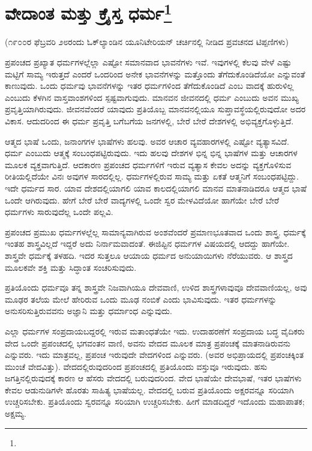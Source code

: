
\chapter{ವೇದಾಂತ ಮತ್ತು ಕ್ರೈಸ್ತ ಧರ್ಮ\protect\footnote{}}

\begin{center}
(೧೯೦೦ರ ಫೆಬ್ರವರಿ ೨೮ರಂದು ಓಕ್‌ಲ್ಯಾಂಡಿನ ಯೂನಿಟೇರಿಯನ್ ಚರ್ಚಿನಲ್ಲಿ ನೀಡಿದ ಪ್ರವಚನದ ಟಿಪ್ಪಣಿಗಳು)
\end{center}

ಪ್ರಪಂಚದ ಪ್ರಖ್ಯಾತ ಧರ್ಮಗಳಲ್ಲೆಲ್ಲಾ ಎಷ್ಟೋ ಸಮಾನವಾದ ಭಾವನೆಗಳು ಇವೆ. ಇವುಗಳಲ್ಲಿ ಕೆಲವು ವೇಳೆ ಎಷ್ಟು ಮಟ್ಟಿಗೆ ಸಾಮ್ಯ ಇರುತ್ತದೆ ಎಂದರೆ ಒಂದರಿಂದ ಅನೇಕ ಭಾವನೆಗಳನ್ನು ಮತ್ತೊಂದು ತೆಗೆದುಕೊಂಡಿದೆಯೋ ಎನ್ನುವಂತೆ ಕಾಣುವುದು. ಒಂದು ಧರ್ಮವು ಭಾವನೆಗಳನ್ನು ಇತರ ಧರ್ಮಗಳಿಂದ ತೆಗೆದುಕೊಂಡಿದೆ ಎಂಬ ವಾದಕ್ಕೆ ಹುರುಳಿಲ್ಲ ಎಂಬುದು ಕೆಳಗಿನ ವಾಸ್ತವಾಂಶಗಳಿಂದ ಸ್ಪಷ್ಟವಾಗುವುದು. ಮಾನವನ ಜೀವನದಲ್ಲಿ ಧರ್ಮ ಎಂಬುದು ಅವನ ಮುಖ್ಯ ಪ್ರವೃತ್ತಿಯಾಗಿರುವುದು. ಜೀವನವೆಂದರೆ ಯಾವುದು ಪ್ರತಿಯೊಬ್ಬ ಮಾನವನಲ್ಲಿಯೂ ಸುಪ್ತಾವಸ್ಥೆಯಲ್ಲಿರುವುದೋ ಅದರ ವಿಕಾಸ. ಆದುದರಿಂದ ಈ ಧರ್ಮ ಪ್ರವೃತ್ತಿ ಬಗೆಬಗೆಯ ಜನಗಳಲ್ಲಿ, ಬೇರೆ ಬೇರೆ ದೇಶಗಳಲ್ಲಿ ಅಭಿವ್ಯಕ್ತಗೊಳ್ಳುತ್ತಿದೆ.

ಆತ್ಮದ ಭಾಷೆ ಒಂದು, ಜನಾಂಗಗಳ ಭಾಷೆಗಳು ಹಲವು. ಅವರ ಆಚಾರ ವ್ಯವಹಾರಗಳಲ್ಲಿ ಎಷ್ಟೋ ವ್ಯತ್ಯಾಸವಿದೆ. ಧರ್ಮ ಎಂಬುದು ಆತ್ಮಕ್ಕೆ ಸಂಬಂಧಪಟ್ಟಿರುವುದು. ಇದು ಹಲವು ದೇಶಗಳ ಭಿನ್ನ ಭಿನ್ನ ಭಾಷೆಗಳ ಮತ್ತು ಆಚಾರಗಳ ಮೂಲಕ ವ್ಯಕ್ತವಾಗುತ್ತಿದೆ. ಆದಕಾರಣ ಪ್ರಪಂಚದ ಧರ್ಮಗಳಿಗೆ ಇರುವ ವ್ಯತ್ಯಾಸ ಕೇವಲ ಅದನ್ನು ವ್ಯಕ್ತಗೊಳಿಸುವ ರೀತಿಯಲ್ಲಿದೆಯೇ ವಿನಃ ಅವುಗಳ ಸಾರದಲ್ಲಿಲ್ಲ. ಧರ್ಮಗಳಲ್ಲಿರುವ ಸಾಮ್ಯ ಮತ್ತು ಏಕತೆ ಆತ್ಮನಿಗೆ ಸಂಬಂಧಪಟ್ಟಿದ್ದು. ಇದೇ ಧರ್ಮದ ಸಾರ. ಯಾವ ದೇಶದಲ್ಲಿಯಾಗಲಿ ಯಾವ ಕಾಲದಲ್ಲಿಯಾಗಲಿ ಮಾನವ ಮಾತನಾಡಿದರೂ ಆತ್ಮದ ಭಾಷೆ ಒಂದೇ ಆಗಿರುವುದು. ಹೇಗೆ ಬೇರೆ ಬೇರೆ ವಾದ್ಯಗಳಲ್ಲಿ ಒಂದೇ ಸ್ವರ ಮೇಳವಿದೆಯೋ ಹಾಗೆಯೇ ಬೇರೆ ಬೇರೆ ಧರ್ಮಗಳು ಸಾರುವುದೆಲ್ಲ ಒಂದೇ ಪಲ್ಲವಿ.

ಪ್ರಪಂಚದ ಪ್ರಮುಖ ಧರ್ಮಗಳಲ್ಲೆಲ್ಲ ಸಾಮಾನ್ಯವಾಗಿರುವ ಅಂಶವೆಂದರೆ ಪ್ರಮಾಣಭೂತವಾದ ಒಂದು ಶಾಸ್ತ್ರ. ಧರ್ಮಕ್ಕೆ ಇಂತಹ ಶಾಸ್ತ್ರವಿಲ್ಲದೆ ಇದ್ದರೆ ಅದು ನಿರ್ನಾಮವಾದಂತೆ. ಈಜಿಪ್ಟಿನ ಧರ್ಮಗಳ ವಿಷಯದಲ್ಲಿ ಆದದ್ದು ಹಾಗೆಯೇ. ಶಾಸ್ತ್ರವೇ ಧರ್ಮಕ್ಕೆ ತಳಹದಿ. ಇದರ ಸುತ್ತಲೂ ಆಯಾಯ ಧರ್ಮದ ಅನುಯಾಯಿಗಳು ನೆರೆಯುವರು. ಆ ಶಾಸ್ತ್ರದ ಮೂಲಕವೇ ಶಕ್ತಿ ಮತ್ತು ಸಿದ್ಧಾಂತ ಸಂಚರಿಸುವುದು.

ಪ್ರತಿಯೊಂದು ಧರ್ಮವೂ ತನ್ನ ಶಾಸ್ತ್ರವೇ ನಿಜವಾಗಿಯೂ ದೇವವಾಣಿ, ಉಳಿದ ಶಾಸ್ತ್ರಗಳಾವುವೂ ದೇವವಾಣಿಯಲ್ಲ, ಅವು ಮೂಢರ ತಲೆಯ ಮೇಲೆ ಹೇರಿರುವ ಒಂದು ಮೂಢ ನಂಬಿಕೆ ಎಂದು ಭಾವಿಸುವುದು. ಇತರ ಧರ್ಮಗಳನ್ನು ಅನುಸರಿಸುತ್ತಿರುವವನು ಅಜ್ಞಾನಿ ಮತ್ತು ಧರ್ಮಾಂಧ ಎನ್ನುವುದು.

ಎಲ್ಲಾ ಧರ್ಮಗಳ ಸಂಪ್ರದಾಯಬದ್ದರಲ್ಲಿ ಇರುವ ಮತಾಂಧತೆಯೇ ಇದು. ಉದಾಹರಣೆಗೆ ಸಂಪ್ರದಾಯ ಬದ್ಧ ವೈದಿಕರು ವೇದ ಒಂದೇ ಪ್ರಪಂಚದಲ್ಲಿ ಭಗವಂತನ ವಾಣಿ, ಅವನು ವೇದದ ಮೂಲಕ ಮಾತ್ರ ಪ್ರಪಂಚಕ್ಕೆ ಮಾತನಾಡಿರುವನು ಎನ್ನುವರು. ಇದು ಮಾತ್ರವಲ್ಲ, ಪ್ರಪಂಚ ಇರುವುದೇ ವೇದಗಳಿಂದ ಎನ್ನುವರು. (ಅವರ ಅಭಿಪ್ರಾಯದಲ್ಲಿ ಪ್ರಪಂಚಕ್ಕಿಂತ ಮುಂಚೆ ವೇದವಿತ್ತು). ವೇದದಲ್ಲಿರುವುದರಿಂದ ಪ್ರಪಂಚದಲ್ಲಿ ಪ್ರತಿಯೊಂದು ವಸ್ತುವೂ ಇರುವುದು. ಹಸು ಜಗತ್ತಿನಲ್ಲಿರುವುದಕ್ಕೆ ಕಾರಣ ಆ ಹೆಸರು ವೇದದಲ್ಲಿ ಬರುವುದರಿಂದ. ವೇದ ಭಾಷೆಯೇ ದೇವಭಾಷೆ, ಇತರ ಭಾಷೆಗಳು ಕೇವಲ ಆಡುನುಡಿಗಳೇ ಹೊರತು ಸಾಹಿತ್ಯ ಭಾಷೆಯಲ್ಲ. ವೇದದಲ್ಲಿ ಬರುವ ಪ್ರತಿಯೊಂದು ಅಕ್ಷರವನ್ನೂ ಸರಿಯಾಗಿ ಉಚ್ಚರಿಸಬೇಕು. ಪ್ರತಿಯೊಂದು ಸ್ವರವನ್ನೂ ಸರಿಯಾಗಿ ಉಚ್ಚರಿಸಬೇಕು. ಹೀಗೆ ಮಾಡದಿದ್ದರೆ ಇದೊಂದು ಮಹಾಪಾತಕ; ಅಕ್ಷಮ್ಯ.

